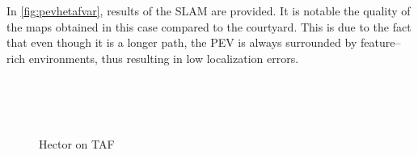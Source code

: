 In \autoref{fig:pevhetafvar}, results of the SLAM are provided. It is notable the quality of the maps obtained in this case compared to the courtyard. This is due to the fact that even though it is a longer path, the PEV is always surrounded by feature--rich environments, thus resulting in low localization errors. \clearpage

\begin{figure}[t!]
  \centering
   \\  
   \\
   \\ 
  \caption{Hector on TAF}
  \label{fig:pevhetafvar}
\end{figure} 

